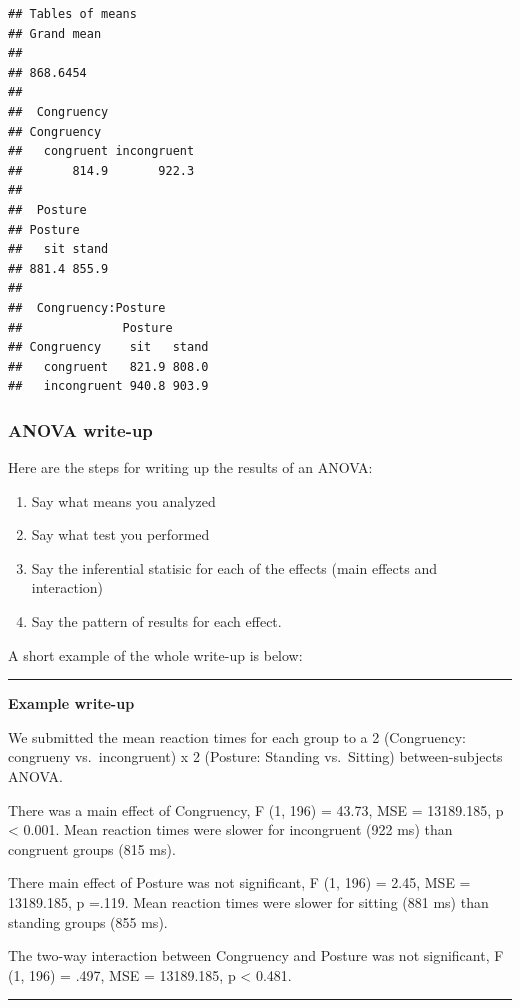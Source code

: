 \documentclass[]{book}
\providecommand{\tightlist}{%
  \setlength{\itemsep}{0pt}\setlength{\parskip}{0pt}}
\begin{document}
\begin{verbatim}
## Tables of means
## Grand mean
##          
## 868.6454 
## 
##  Congruency 
## Congruency
##   congruent incongruent 
##       814.9       922.3 
## 
##  Posture 
## Posture
##   sit stand 
## 881.4 855.9 
## 
##  Congruency:Posture 
##              Posture
## Congruency    sit   stand
##   congruent   821.9 808.0
##   incongruent 940.8 903.9
\end{verbatim}

\subsubsection{ANOVA write-up}\label{anova-write-up}

Here are the steps for writing up the results of an ANOVA:

\begin{enumerate}
\def\labelenumi{\arabic{enumi}.}
\tightlist
\item
  Say what means you analyzed
\item
  Say what test you performed
\item
  Say the inferential statisic for each of the effects (main effects and
  interaction)
\item
  Say the pattern of results for each effect.
\end{enumerate}

A short example of the whole write-up is below:

\begin{center}\rule{0.5\linewidth}{0.5pt}\end{center}

\textbf{Example write-up}

We submitted the mean reaction times for each group to a 2 (Congruency:
congrueny vs.~incongruent) x 2 (Posture: Standing vs.~Sitting)
between-subjects ANOVA.

There was a main effect of Congruency, F (1, 196) = 43.73, MSE =
13189.185, p \textless{} 0.001. Mean reaction times were slower for
incongruent (922 ms) than congruent groups (815 ms).

There main effect of Posture was not significant, F (1, 196) = 2.45, MSE
= 13189.185, p =.119. Mean reaction times were slower for sitting (881
ms) than standing groups (855 ms).

The two-way interaction between Congruency and Posture was not
significant, F (1, 196) = .497, MSE = 13189.185, p \textless{} 0.481.

\begin{center}\rule{0.5\linewidth}{0.5pt}\end{center}
\end{document}
